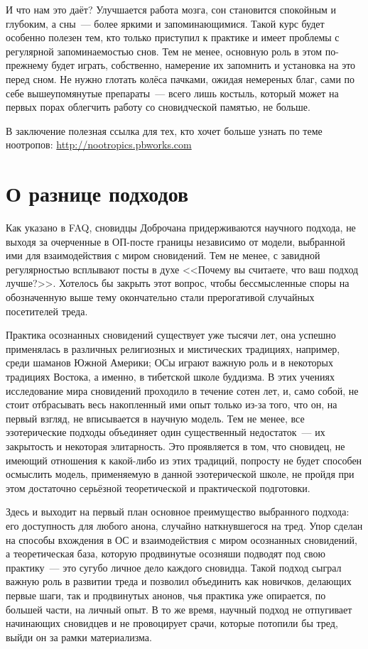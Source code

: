 \documentclass[a4paper,14pt,oneside]{memoir}
\begin{document}
И что нам это даёт? Улучшается работа мозга, сон становится спокойным и глубоким, а сны~--- более яркими и запоминающимися. Такой курс будет особенно полезен тем, кто только приступил к практике и имеет проблемы с регулярной запоминаемостью снов. Тем не менее, основную роль в этом по-прежнему будет играть, собственно, намерение их запомнить и установка на это перед сном. Не нужно глотать колёса пачками, ожидая немереных благ, сами по себе вышеупомянутые препараты~--- всего лишь костыль, который может на первых порах облегчить работу со сновидческой памятью, не больше.

В заключение полезная ссылка для тех, кто хочет больше узнать  по теме ноотропов: \url{http://nootropics.pbworks.com}



\chapter{О разнице подходов}

Как указано в FAQ, сновидцы Доброчана придерживаются научного подхода, не выходя за очерченные в ОП-посте границы независимо от модели, выбранной ими для взаимодействия с миром сновидений. Тем не менее, с завидной регулярностью всплывают посты в духе <<Почему вы считаете, что ваш подход лучше?>>. Хотелось бы закрыть этот вопрос, чтобы бессмысленные споры на обозначенную выше тему окончательно стали прерогативой случайных посетителей треда.

Практика осознанных сновидений существует уже тысячи лет, она успешно применялась в различных религиозных и мистических традициях, например, среди шаманов Южной Америки; ОСы играют важную роль и в некоторых традициях Востока, а именно, в тибетской школе буддизма. В этих учениях исследование мира сновидений проходило в течение сотен лет, и, само собой, не стоит отбрасывать весь накопленный ими опыт только из-за того, что он, на первый взгляд, не вписывается в научную модель. Тем не менее, все эзотерические подходы объединяет один существенный недостаток~--- их закрытость и некоторая элитарность. Это проявляется в том, что сновидец, не имеющий отношения к какой-либо из этих традиций, попросту не будет способен осмыслить модель, применяемую в данной эзотерической школе, не пройдя при этом достаточно серьёзной теоретической и практической подготовки.

Здесь и выходит на первый план основное преимущество выбранного подхода: его доступность для любого анона, случайно наткнувшегося на тред. Упор сделан на способы вхождения в ОС и взаимодействия с миром осознанных сновидений, а теоретическая база, которую продвинутые осозняши подводят под свою практику~--- это сугубо личное дело каждого сновидца. Такой подход сыграл важную роль в развитии треда и позволил объединить как новичков, делающих первые шаги, так и продвинутых анонов, чья практика уже опирается, по большей части, на личный опыт. В то же время, научный подход не отпугивает начинающих сновидцев и не провоцирует срачи, которые потопили бы тред, выйди он за рамки материализма.
\end{document}
